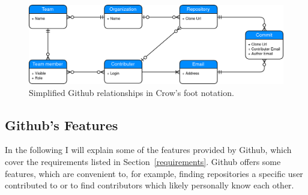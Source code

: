\begin{figure}[H]
\includegraphics[scale=0.27]{./graphs/github-data-structure}
\centering
\caption{Simplified Github relationships in Crow's foot notation.}\label{fig:github-relationship}
\end{figure}

\subsection{Github's Features}\label{github-features}
In the following I will explain some of the features provided by Github, which cover the requirements listed in Section~\ref{requirements}.
Github offers some features, which are convenient to, for example, finding repositories a specific user contributed to or to find contributors which likely personally know each other.

